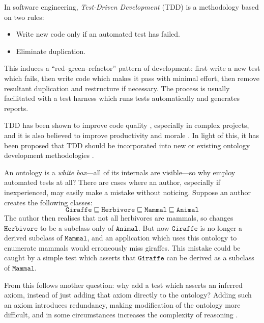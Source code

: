 \documentclass[paper.tex]{subfiles}
\begin{document}
In software engineering, \emph{Test-Driven Development} (TDD) \cite{Beck:TDD} is a methodology based on two rules:
\begin{itemize}[nosep]
  \item Write new code only if an automated test has failed.
  \item Eliminate duplication.
\end{itemize}
This induces a ``red--green--refactor'' pattern of development: first write a new test which fails, then write code which makes it pass with minimal effort, then remove resultant duplication and restructure if necessary.  The process is usually facilitated with a test harness which runs tests automatically and generates reports.

TDD has been shown to improve code quality \cite{Rafique:TDD}, especially in complex projects, and it is also believed to improve productivity and morale \todo[cite].  In light of this, it has been proposed that TDD should be incorporated into new or existing ontology development methodologies \cite{Keet:TDDOntologies}.

An ontology is a \emph{white box}---all of its internals are visible---so why employ automated tests at all?  There are cases where an author, especially if inexperienced, may easily make a mistake without noticing.  Suppose an author creates the following classes:
\[ \mathtt{Giraffe} \sqsubseteq \mathtt{Herbivore} \sqsubseteq \mathtt{Mammal} \sqsubseteq \mathtt{Animal} \]
The author then realises that not all herbivores are mammals, so changes $\mathtt{Herbivore}$ to be a subclass only of $\mathtt{Animal}$.  But now $\mathtt{Giraffe}$ is no longer a derived subclass of $\mathtt{Mammal}$, and an application which uses this ontology to enumerate mammals would erroneously miss giraffes.  This mistake could be caught by a simple test which asserts that $\mathtt{Giraffe}$ can be derived as a subclass of $\mathtt{Mammal}$.

From this follows another question: why add a test which asserts an inferred axiom, instead of just adding that axiom directly to the ontology?  Adding such an axiom introduces redundancy, making modification of the ontology more difficult, and in some circumstances increases the complexity of reasoning \cite{Vrandecic:UnitTestsOntologies}.
\end{document}
